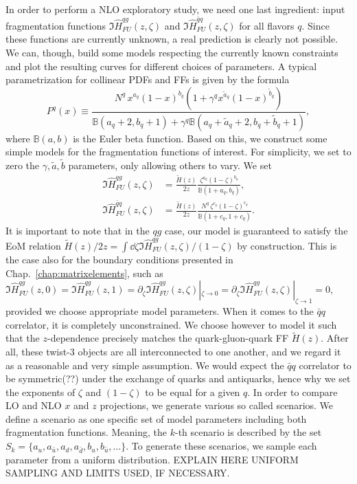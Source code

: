 In order to perform a NLO exploratory study, we need one last ingredient: input fragmentation functions $\Im \hat{H}^{qg}_{FU}(z,\zeta)$ and  $\Im \hat{H}^{\bar{q}q}_{FU}(z,\zeta)$ for all flavors $q$. Since these functions are currently unknown, a real prediction is clearly not possible. We can, though, build some models respecting the currently known constraints and plot the resulting curves for different choices of parameters. A typical parametrization for collinear PDFs and FFs is given by the formula \cite{Gamberg2022Htilde}
\begin{equation}
    P^q(x) \equiv \frac{N^q\, x^{a_q} (1-x)^{b_q}\left( 1+\gamma^q x^{\tilde{a}_q}(1-x)^{\tilde{b}_q}\right)}{\mathbb{B}(a_q+2,b_q+1) + \gamma^q \mathbb{B}(a_q+\tilde{a}_q+2 , b_q + \tilde{b}_q +1)},
\end{equation} 
where $\mathbb{B}(a,b)$ is the Euler beta function. Based on this, we construct some simple models for the fragmentation functions of interest. For simplicity, we set to zero the $\gamma,\tilde{a},\tilde{b}$ parameters, only allowing others to vary. We set
\begin{equation}
    \begin{aligned}
        \Im \hat{H}^{qg}_{FU}(z,\zeta) &= \frac{\tilde{H}(z)}{2 z} \frac{\zeta^{a_q} (1-\zeta)^{b_q}}{\mathbb{B}(1+a_q,b_q)},\\
        \Im \hat{H}^{\bar{q}q}_{FU}(z,\zeta) &= \frac{\tilde{H}(z)}{2 z} \frac{N^q \,\zeta^{c_q} (1-\zeta)^{c_q}}{\mathbb{B}(1+c_q,1+c_q)}.
    \end{aligned}
\end{equation}
It is important to note that in the $qg$ case, our model is guaranteed to satisfy the EoM relation $\tilde{H}(z)/2z=\int\dd\zeta \Im \hat{H}^{qg}_{FU}(z,\zeta)/(1-\zeta)$ by construction. This is the case also for the boundary conditions presented in Chap.~\ref{chap:matrixelements}, such as $\Im \hat{H}^{qg}_{FU}(z,0)=\Im \hat{H}^{qg}_{FU}(z,1)= \partial_\zeta \Im \hat{H}^{qg}_{FU}(z,\zeta)|_{\zeta\to 0}=\partial_\zeta \Im \hat{H}^{qg}_{FU}(z,\zeta)|_{\zeta\to 1}=0$, provided we choose appropriate model parameters. When it comes to the $\bar{q}q$ correlator, it is completely unconstrained. We choose however to model it such that the $z$-dependence precisely matches the quark-gluon-quark FF $\tilde{H}(z)$. After all, these twist-3 objects are all interconnected to one another, and we regard it as a reasonable and very simple assumption. We would expect the $\bar{q}q$ correlator to be symmetric(??) under the exchange of quarks and antiquarks, hence why we set the exponents of $\zeta$ and $(1-\zeta)$ to be equal for a given $q$. 
In order to compare LO and NLO $x$ and $z$ projections, we generate various so called scenarios. We define a scenario as one specific set of model parameters including both fragmentation functions. Meaning, the $k$-th scenario is described by the set $S_k=\{a_u,a_{\bar{u}},a_d,a_{\bar{d}},b_u,b_{\bar{u}},\dots \}$. To generate these scenarios, we sample each parameter from a uniform distribution. EXPLAIN HERE UNIFORM SAMPLING AND LIMITS USED, IF NECESSARY.

